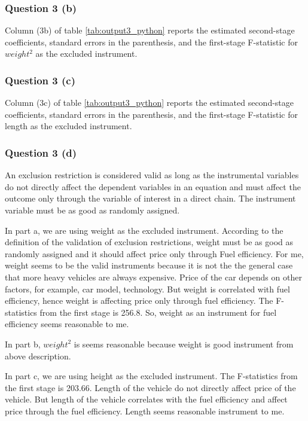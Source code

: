 \documentclass{article}
\begin{document}
\subsubsection{Question 3 (b)}
Column (3b) of table \ref{tab:output3_python} reports the estimated second-stage coefficients, standard errors in the parenthesis, and the first-stage F-statistic for $weight^2$ as the excluded instrument.

\subsubsection{Question 3 (c)}
Column (3c) of table \ref{tab:output3_python} reports the estimated second-stage coefficients, standard errors in the parenthesis, and the first-stage F-statistic for length as the excluded instrument.

\subsubsection{Question 3 (d)}
An exclusion restriction is considered valid as long as the instrumental variables do not directly affect the dependent variables in an equation and must affect the outcome 
only through the variable of interest in a direct chain. The instrument variable must be as good as randomly assigned.

In part a, we are using weight as the excluded instrument. According to the definition of the validation of exclusion restrictions, weight must be as good as randomly assigned and it should affect price only through Fuel efficiency. For me, weight seems to be the valid instruments because it is not the the general case that more heavy vehicles are always expensive. Price of the car depends on other factors, for example, car model, technology. But weight is correlated with fuel efficiency, hence weight is affecting price only through fuel efficiency. The F-statistics from the first stage is 256.8. So, weight as an instrument for fuel efficiency seems reasonable to me.

In part b, $weight^2$ is seems reasonable because weight is good instrument from above description.

In part c, we are using height as the excluded instrument. The F-statistics from the first stage is 203.66. Length of the vehicle do not directly affect price of the vehicle. But length of the vehicle correlates with the fuel efficiency and affect price through the fuel efficiency. Length seems reasonable instrument to me.
\end{document}
